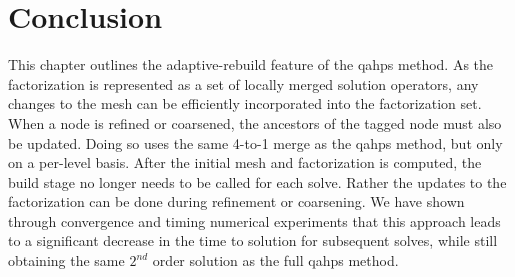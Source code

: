 \section{Conclusion}

This chapter outlines the adaptive-rebuild feature of the \gls{qahps} method. As the factorization is represented as a set of locally merged solution operators, any changes to the mesh can be efficiently incorporated into the factorization set. When a node is refined or coarsened, the ancestors of the tagged node must also be updated. Doing so uses the same 4-to-1 merge as the \gls{qahps} method, but only on a per-level basis. After the initial mesh and factorization is computed, the build stage no longer needs to be called for each solve. Rather the updates to the factorization can be done during refinement or coarsening. We have shown through convergence and timing numerical experiments that this approach leads to a significant decrease in the time to solution for subsequent solves, while still obtaining the same $2^{nd}$ order solution as the full \gls{qahps} method.